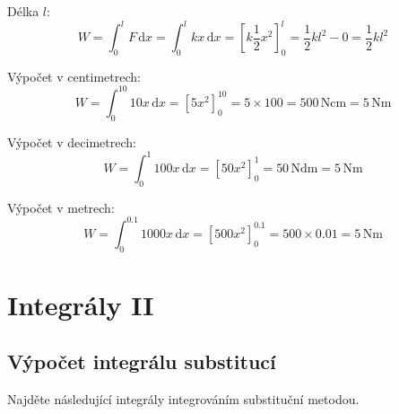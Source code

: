 Délka $l$:
$$W=\int_0^l F\,\mathrm dx = \int_0^l kx\,\mathrm dx = \left[k\frac 12 x^2\right]_0^l=\frac 12 kl^2-0=\frac 12 kl^2$$

Výpočet v centimetrech:
$$W=\int_0^{10}  10 x\,\mathrm dx = \left[5 x^2\right]_0^{10}=5\times 100=500\,\mathrm N \mathrm{cm}=5\,\mathrm N\mathrm m$$


Výpočet v decimetrech:
$$W=\int_0^{1}  100 x\,\mathrm dx = \left[50 x^2\right]_0^{1}=50\,\mathrm N \mathrm{dm}=5\,\mathrm N\mathrm m$$

Výpočet v metrech:
$$W=\int_0^{0.1}  1000 x\,\mathrm dx = \left[500 x^2\right]_0^{0.1}=500\times 0.01=5\,\mathrm N \mathrm{m}$$


\konec





\stranka
\section{Integrály II}



\stranka
\subsection{Výpočet integrálu substitucí} Najděte následující integrály integrováním substituční metodou.


